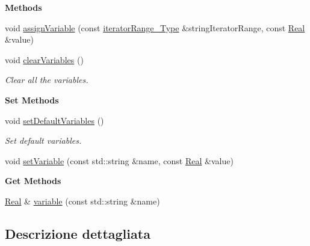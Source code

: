 \begin{Indent}{\bf Methods}\par
\begin{DoxyCompactItemize}
\item 
void \hyperlink{classLifeV_1_1ParserSpiritGrammar_a026a60af01b958c4f06877b40bbd19bf}{assign\-Variable} (const \hyperlink{classLifeV_1_1ParserSpiritGrammar_a8aca47ceac2876986dbc2ff9ee4d2edd}{iterator\-Range\-\_\-\-Type} \&string\-Iterator\-Range, const \hyperlink{namespaceLifeV_ad58c7402b26e5087b634b25d029c9c32}{Real} \&value)
\item 
void \hyperlink{classLifeV_1_1ParserSpiritGrammar_a81b8e2abdda8a35738367f2dcfb69c75}{clear\-Variables} ()
\begin{DoxyCompactList}\small\item\em Clear all the variables. \end{DoxyCompactList}\end{DoxyCompactItemize}
\end{Indent}
\begin{Indent}{\bf Set Methods}\par
\begin{DoxyCompactItemize}
\item 
void \hyperlink{classLifeV_1_1ParserSpiritGrammar_aa48cdca46ab32d3c1e55e656aa82e902}{set\-Default\-Variables} ()
\begin{DoxyCompactList}\small\item\em Set default variables. \end{DoxyCompactList}\item 
void \hyperlink{classLifeV_1_1ParserSpiritGrammar_a357a7e8d98940858ac6e05c106082e2e}{set\-Variable} (const std\-::string \&name, const \hyperlink{namespaceLifeV_ad58c7402b26e5087b634b25d029c9c32}{Real} \&value)
\end{DoxyCompactItemize}
\end{Indent}
\begin{Indent}{\bf Get Methods}\par
\begin{DoxyCompactItemize}
\item 
\hyperlink{namespaceLifeV_ad58c7402b26e5087b634b25d029c9c32}{Real} \& \hyperlink{classLifeV_1_1ParserSpiritGrammar_a768e48421db190a4eba5144932ddc4f6}{variable} (const std\-::string \&name)
\end{DoxyCompactItemize}
\end{Indent}


\subsection{Descrizione dettagliata}
